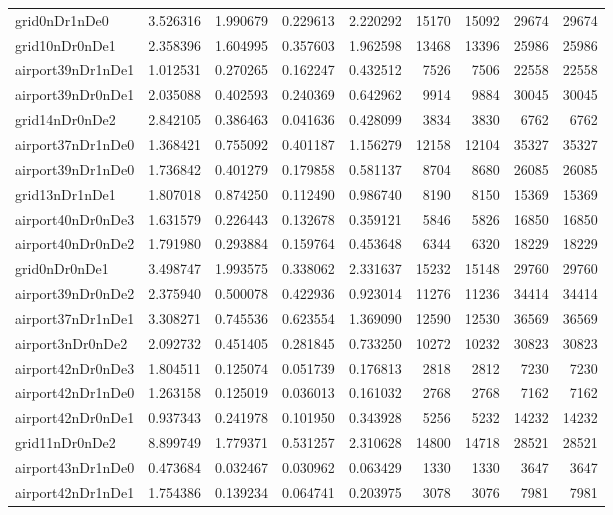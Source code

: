 \begin{longtable}{|l|r|r|r|r|r|r|r|r|}
grid0nDr1nDe0 & 3.526316 & 1.990679 & 0.229613 & 2.220292 & 15170 & 15092 & 29674 & 29674 \\
grid10nDr0nDe1 & 2.358396 & 1.604995 & 0.357603 & 1.962598 & 13468 & 13396 & 25986 & 25986 \\
airport39nDr1nDe1 & 1.012531 & 0.270265 & 0.162247 & 0.432512 & 7526 & 7506 & 22558 & 22558 \\
airport39nDr0nDe1 & 2.035088 & 0.402593 & 0.240369 & 0.642962 & 9914 & 9884 & 30045 & 30045 \\
grid14nDr0nDe2 & 2.842105 & 0.386463 & 0.041636 & 0.428099 & 3834 & 3830 & 6762 & 6762 \\
airport37nDr1nDe0 & 1.368421 & 0.755092 & 0.401187 & 1.156279 & 12158 & 12104 & 35327 & 35327 \\
airport39nDr1nDe0 & 1.736842 & 0.401279 & 0.179858 & 0.581137 & 8704 & 8680 & 26085 & 26085 \\
grid13nDr1nDe1 & 1.807018 & 0.874250 & 0.112490 & 0.986740 & 8190 & 8150 & 15369 & 15369 \\
airport40nDr0nDe3 & 1.631579 & 0.226443 & 0.132678 & 0.359121 & 5846 & 5826 & 16850 & 16850 \\
airport40nDr0nDe2 & 1.791980 & 0.293884 & 0.159764 & 0.453648 & 6344 & 6320 & 18229 & 18229 \\
grid0nDr0nDe1 & 3.498747 & 1.993575 & 0.338062 & 2.331637 & 15232 & 15148 & 29760 & 29760 \\
airport39nDr0nDe2 & 2.375940 & 0.500078 & 0.422936 & 0.923014 & 11276 & 11236 & 34414 & 34414 \\
airport37nDr1nDe1 & 3.308271 & 0.745536 & 0.623554 & 1.369090 & 12590 & 12530 & 36569 & 36569 \\
airport3nDr0nDe2 & 2.092732 & 0.451405 & 0.281845 & 0.733250 & 10272 & 10232 & 30823 & 30823 \\
airport42nDr0nDe3 & 1.804511 & 0.125074 & 0.051739 & 0.176813 & 2818 & 2812 & 7230 & 7230 \\
airport42nDr1nDe0 & 1.263158 & 0.125019 & 0.036013 & 0.161032 & 2768 & 2768 & 7162 & 7162 \\
airport42nDr0nDe1 & 0.937343 & 0.241978 & 0.101950 & 0.343928 & 5256 & 5232 & 14232 & 14232 \\
grid11nDr0nDe2 & 8.899749 & 1.779371 & 0.531257 & 2.310628 & 14800 & 14718 & 28521 & 28521 \\
airport43nDr1nDe0 & 0.473684 & 0.032467 & 0.030962 & 0.063429 & 1330 & 1330 & 3647 & 3647 \\
airport42nDr1nDe1 & 1.754386 & 0.139234 & 0.064741 & 0.203975 & 3078 & 3076 & 7981 & 7981 \\

\end{longtable}
